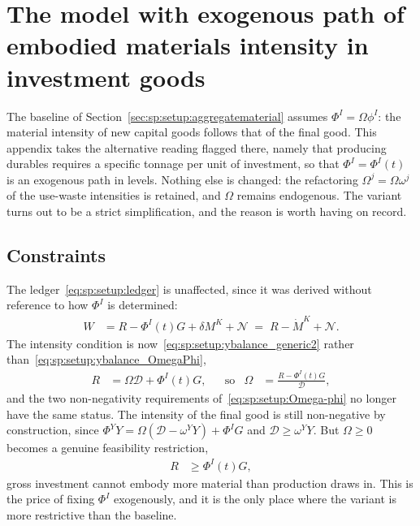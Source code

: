 \section{The model with exogenous path of embodied materials intensity in investment goods}\label{sec:app:exogenousPhiI}

The baseline of Section~\ref{sec:sp:setup:aggregatematerial} assumes $\Phi^I=\Omega\phi^I$: the material
intensity of new capital goods follows that of the final good. This appendix takes the alternative
reading flagged there, namely that producing durables requires a specific tonnage per unit of
investment, so that $\Phi^I=\Phi^I\left(t\right)$ is an exogenous path in levels. Nothing else is
changed: the refactoring $\Omega^j=\Omega\omega^j$ of the use-waste intensities is retained, and
$\Omega$ remains endogenous. The variant turns out to be a strict simplification, and the reason is
worth having on record.

\subsection{Constraints}\label{sec:app:exo:constraints}

The ledger~\eqref{eq:sp:setup:ledger} is unaffected, since it was derived without reference to how
$\Phi^I$ is determined:
\begin{align}
W &= R-\Phi^I\!\left(t\right)G+\delta M^K+\mathcal N \;=\; R-\dot M^K+\mathcal N .
\label{eq:app:exo:ledger}
\end{align}
The intensity condition is now~\eqref{eq:sp:setup:ybalance_generic2} rather
than~\eqref{eq:sp:setup:ybalance_OmegaPhi},
\begin{align}
R &= \Omega\mathcal D+\Phi^I\!\left(t\right)G,
&&\text{so}&
\Omega &= \frac{R-\Phi^I\!\left(t\right)G}{\mathcal D},
\label{eq:app:exo:intensity}
\end{align}
and the two non-negativity requirements of~\eqref{eq:sp:setup:Omega-phi} no longer have the same
status. The intensity of the final good is still non-negative by construction, since
$\Phi^YY=\Omega\left(\mathcal D-\omega^YY\right)+\Phi^IG$ and $\mathcal D\ge\omega^YY$. But
$\Omega\ge0$ becomes a genuine feasibility restriction,
\begin{align}
R &\ge \Phi^I\!\left(t\right)G ,
\label{eq:app:exo:feasibility}
\end{align}
gross investment cannot embody more material than production draws in. This is the price of fixing
$\Phi^I$ exogenously, and it is the only place where the variant is more restrictive than the
baseline.

